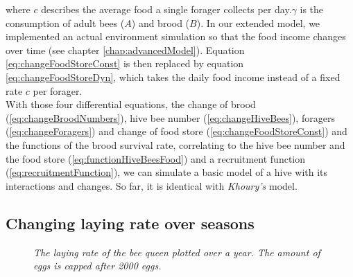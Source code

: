 	where $c$ describes the average food a single forager collects per day.$\gamma$ is the consumption of adult bees ($A$) and brood ($B$). In our extended model, we implemented an actual environment simulation so that the food income changes over time (see chapter \ref{chap:advancedModel}). Equation \ref{eq:changeFoodStoreConst} is then replaced by equation \ref{eq:changeFoodStoreDyn}, which takes the daily food income instead of a fixed rate $c$ per forager.\\	
	With those four differential equations, the change of brood (\ref{eq:changeBroodNumbers}), hive bee number (\ref{eq:changeHiveBees}), foragers (\ref{eq:changeForagers}) and change of food store (\ref{eq:changeFoodStoreConst}) and the functions of the brood survival rate, correlating to the hive bee number and the food store (\ref{eq:functionHiveBeesFood}) and a recruitment function (\ref{eq:recruitmentFunction}), we can simulate a basic model of a hive with its interactions and changes. So far, it is identical with \textit{Khoury's} model.

	\subsection{Changing laying rate over seasons}
		\begin{figure}[H]
			\centering
			\caption{\textit{The laying rate of the bee queen plotted over a year. The amount of eggs is capped after 2000 eggs. }}
			\label{fig:dynLayingRate}
		\end{figure}
		
